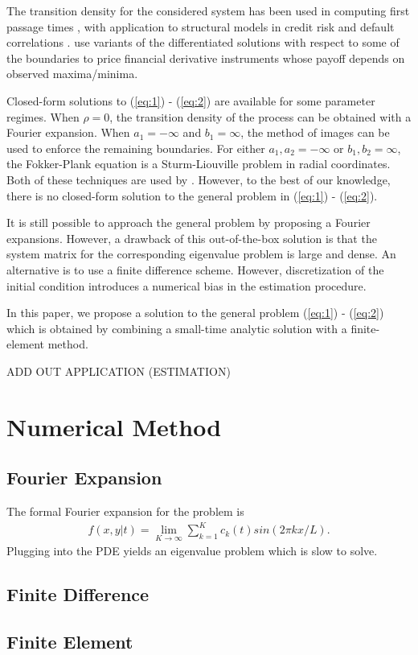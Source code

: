 \documentclass[10pt]{article}
\begin{document}
The transition density for the considered system has been used in
computing first passage times \citep{kou2016first,
  sacerdote2012first}, with application to structural models in credit
risk and default correlations \citep{haworth2008modelling,
  ching2014correlated}. \citep{he1998double} use variants of the
differentiated solutions with respect to some of the boundaries to
price financial derivative instruments whose payoff depends on
observed maxima/minima. 

Closed-form solutions to (\ref{eq:1}) - (\ref{eq:2}) are available for
some parameter regimes. When $\rho = 0$, the transition density of the
process can be obtained with a Fourier expansion. When $a_1 = -\infty$
and $b_1 = \infty$, the method of images can be used to enforce the
remaining boundaries. For either $a_1, a_2 = -\infty$ or
$b_1, b_2 = \infty$, the Fokker-Plank equation is a Sturm-Liouville
problem in radial coordinates. Both of these techniques are used by
\cite{he1998double}. However, to the best of our knowledge, there is
no closed-form solution to the general problem in (\ref{eq:1}) -
(\ref{eq:2}).

It is still possible to approach the general problem by proposing a
Fourier expansions. However, a drawback of this out-of-the-box
solution is that the system matrix for the corresponding eigenvalue
problem is large and dense. An alternative is to use a finite
difference scheme. However, discretization of the initial condition
introduces a numerical bias in the estimation procedure.

In this paper, we propose a solution to the general problem
(\ref{eq:1}) - (\ref{eq:2}) which is obtained by combining a
small-time analytic solution with a finite-element method.

ADD OUT APPLICATION (ESTIMATION)

\section{Numerical Method}
\subsection{Fourier Expansion}

The formal Fourier expansion for the problem is
\begin{align*}
  f(x,y | t) = \lim_{K\to\infty}\sum_{k=1}^K c_k(t) sin(2\pi k x/L).
\end{align*}
Plugging into the PDE yields an eigenvalue problem which is slow to solve.

\subsection{Finite Difference}

\subsection{Finite Element}



\end{document}

